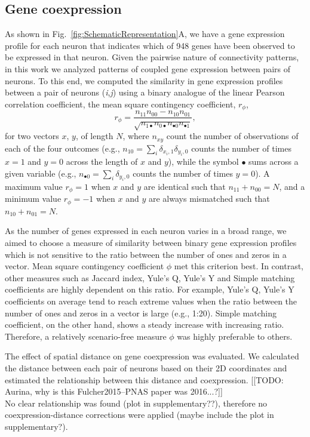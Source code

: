\documentclass[10pt,letterpaper]{article}
\begin{document}
\subsection*{Gene coexpression}
As shown in Fig.~\ref{fig:SchematicRepresentation}A, we have a gene expression profile for each neuron that indicates which of 948 genes have been observed to be expressed in that neuron.
Given the pairwise nature of connectivity patterns, in this work we analyzed patterns of coupled gene expression between pairs of neurons.
To this end, we computed the similarity in gene expression profiles between a pair of neurons (\textit{i},\textit{j}) using a binary analogue of the linear Pearson correlation coefficient, the mean square contingency coefficient, $r_\phi$,
\begin{equation}
    r_\phi = \frac{n_{11}n_{00} - n_{10}n_{01}}{\sqrt{n_{1\bullet}n_{0\bullet}n_{\bullet 0}n_{\bullet 1}}},
\end{equation}
for two vectors $x$, $y$, of length $N$, where $n_{xy}$ count the number of observations of each of the four outcomes (e.g., $n_{10} = \sum_i \delta_{x_i,1}\delta_{y_i,0}$ counts the number of times $x=1$ and $y=0$ across the length of $x$ and $y$), while the symbol $\bullet$ sums across a given variable (e.g., $n_{\bullet 0} = \sum_i \delta_{y_i,0}$ counts the number of times $y = 0$).
A maximum value $r_\phi = 1$ when $x$ and $y$ are identical such that $n_{11} + n_{00} = N$, and a minimum value $r_\phi = -1$ when $x$ and $y$ are always mismatched such that $n_{10} + n_{01} = N$.

As the number of genes expressed in each neuron varies in a broad range, we aimed to choose a measure of similarity between binary gene expression profiles which is not sensitive to the ratio between the number of ones and zeros in a vector.
Mean square contingency coefficient $\phi$ met this criterion best.
In contrast, other measures such as Jaccard index, Yule's Q, Yule's Y and Simple matching coefficients are highly dependent on this ratio.
For example, Yule's Q, Yule's Y coefficients on average tend to reach extreme values when the ratio between the number of ones and zeros in a vector is large (e.g., 1:20).
Simple matching coefficient, on the other hand, shows a steady increase with increasing ratio.
Therefore, a relatively scenario-free measure $\phi$ was highly preferable to others.

The effect of spatial distance on gene coexpression \cite{Fulcher2015} was evaluated.
We calculated the distance between each pair of neurons based on their 2D coordinates and estimated the relationship between this distance and coexpression.
[[TODO: Aurina, why is this Fulcher2015--PNAS paper was 2016...?]]\\
No clear relationship was found (plot in supplementary??), therefore no coexpression-distance corrections were applied (maybe include the plot in supplementary?).
\end{document}

